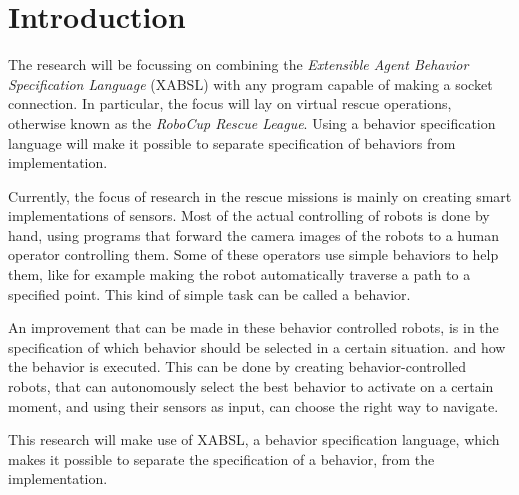 \documentclass[a4paper,10pt]{article}
\begin{document}


\section{Introduction}
The research will be focussing on combining the \textit{Extensible Agent
Behavior Specification Language} (XABSL) with any program capable of making a
socket connection. In particular, the focus will lay on virtual rescue
operations, otherwise known as the \textit{RoboCup Rescue League}. Using a
behavior specification language will make it possible to separate specification
of behaviors from implementation.

Currently, the focus of research in the rescue missions is mainly on creating
smart implementations of sensors. Most of the actual controlling of robots is
done by hand, using programs that forward the camera images of the robots to a
human operator controlling them. Some of these operators use simple behaviors to
help them, like for example making the robot automatically traverse a path to a
specified point. This kind of simple task can be called a behavior.

An improvement that can be made in these behavior controlled robots, is in 
the specification of which behavior should be selected in a certain situation.
and how the behavior is executed. This can be done by creating
behavior-controlled robots, that can autonomously select the best behavior to
activate on a certain moment, and using their sensors as input, can choose the
right way to navigate.

This research will make use of XABSL, a behavior specification language, which
makes it possible to separate the specification of a behavior, from the implementation.

%
\end{document}
